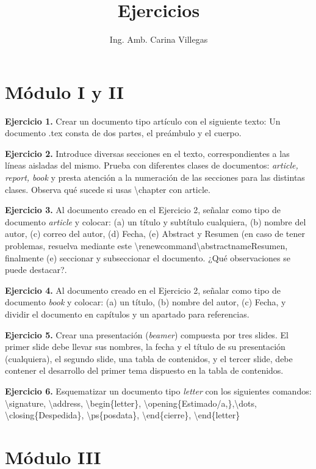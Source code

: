\documentclass{article}
\title{\textbf{Ejercicios}}
\author{Ing. Amb. Carina Villegas}
\begin{document}
\maketitle
\section{Módulo I y II}
\textbf{Ejercicio 1.} Crear un documento tipo artículo con el siguiente texto: Un documento .tex consta de dos partes, el preámbulo y el cuerpo.

\textbf{Ejercicio 2.} Introduce diversas secciones en el texto, correspondientes a las líneas aisladas del mismo. Prueba con diferentes clases de documentos: \textit{article, report, book} y presta atención a la numeración de las secciones para las distintas clases. Observa qué sucede si usas \textbackslash chapter con article.

\textbf{Ejercicio 3.} Al documento creado en el Ejercicio 2, señalar como tipo de documento \textit{article} y colocar: (a) un título y subtítulo cualquiera, (b) nombre del autor, (c) correo del autor, (d) Fecha, (e) Abstract y Resumen (en caso de tener problemas, resuelva mediante este \textbackslash renewcommand\textbackslash abstractname{Resumen}, finalmente (e) seccionar y subseccionar el documento. ¿Qué observaciones se puede destacar?. 

\textbf{Ejercicio 4.} Al documento creado en el Ejercicio 2, señalar como tipo de documento \textit{book} y colocar: (a) un título, (b) nombre del autor, (c) Fecha, y dividir el documento en capítulos y un apartado para referencias. 

\textbf{Ejercicio 5.} Crear una presentación (\textit{beamer}) compuesta por tres slides. El primer slide debe llevar sus nombres, la fecha y el título de su presentación (cualquiera), el segundo slide, una tabla de contenidos, y el tercer slide, debe contener el desarrollo del primer tema dispuesto en la tabla de contenidos.

\textbf{Ejercicio 6.} Esquematizar un documento tipo \textit{letter} con los siguientes comandos: \textbackslash signature, \textbackslash address, \textbackslash begin\{letter\}, \textbackslash opening\{Estimado/a,\},\textbackslash dots, \textbackslash closing\{Despedida\}, \textbackslash ps\{posdata\}, \textbackslash end\{cierre\}, \textbackslash end\{letter\}

\section{Módulo III}
\vspace{0.5cm}
\end{document}
